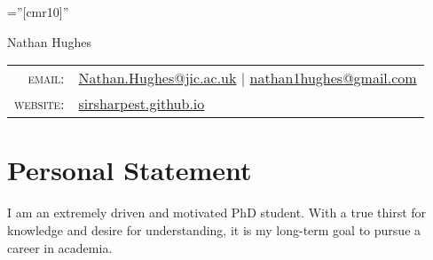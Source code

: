 \documentclass[a4paper,10pt]{article}
\begin{document}

\pagestyle{empty} %

\font\fb=''[cmr10]'' %


\par{\centering
  \vspace{-2ex}
  {\Huge Nathan {Hughes}
  }\bigskip\par}


\begin{center}
  \begin{tabular}{rl}
    \textsc{email:}     & \href{mailto:Nathan.Hughes@jic.ac.uk}{Nathan.Hughes@jic.ac.uk} | \href{mailto:nathan1hughes@gmail.com}{nathan1hughes@gmail.com} \\
    \textsc{website:}  & \href{sirsharpest.github.io}{sirsharpest.github.io}
  \end{tabular}
\end{center}


\section{Personal Statement}
I am an extremely driven and motivated PhD student. With a true thirst for knowledge and desire for understanding, it is my long-term goal to pursue a career in academia.
\end{document}
